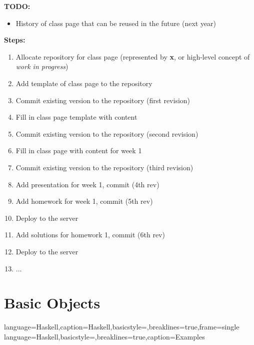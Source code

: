 \documentclass[11pt]{article}
\begin{document}
\textbf{TODO:}
\begin{itemize}
\item History of class page that can be reused in the future (next year)
\end{itemize}

\textbf{Steps:}
\begin{enumerate}
\item Allocate repository for class page (represented by \textbf{x}, or high-level concept of \textit{work in progress})
\item Add template of class page to the repository 
\item Commit existing version to the repository (first revision)
\item Fill in class page template with content 
\item Commit existing version to the repository (second revision)
\item Fill in class page with content for week 1 
\item Commit existing version to the repository (third revision)
\item Add presentation for week 1, commit (4th rev)
\item Add homework for week 1, commit  (5th rev)
\item Deploy to the server
\item Add solutions for homework 1, commit (6th rev)
\item Deploy to the server
\item ...
\end{enumerate}



\section{Basic Objects}
\label{sec:objects}


{
	language=Haskell,caption=Haskell,basicstyle=\footnotesize\ttfamily,breaklines=true,frame=single
}
{
	language=Haskell,basicstyle=\footnotesize\ttfamily,breaklines=true,caption=Examples
}
\lstset{style=Haskell}          %
\end{document}
